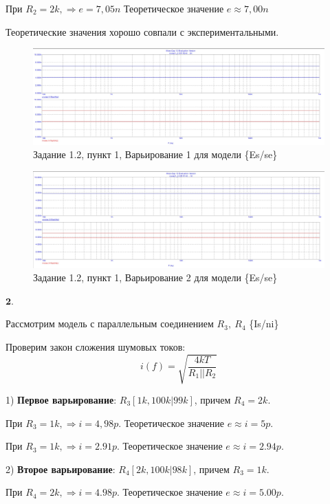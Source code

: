 \documentclass[a4paper, 14pt]{extarticle}%
\begin{document}
При $R_2 = 2k, \Rightarrow  e = 7,05n$
Теоретическое значение $e \approx 7,00n$

Теоретические значения хорошо совпали с экспериментальными.

\begin{figure}[h!]
			\centering
			\includegraphics[width=1.1\linewidth]{1.2/pic4.jpg}
			\caption{Задание 1.2, пункт 1, Варьирование 1 для модели \{Es/se\}}
			\label{A}
\end{figure}

\begin{figure}[h!]
			\centering
			\includegraphics[width=1.1\linewidth]{1.2/pic5.jpg}
			\caption{Задание 1.2, пункт 1, Варьирование 2 для модели \{Es/se\}}
			\label{A}
\end{figure}



$\textbf{2.}$


Рассмотрим модель с параллельным соединением $R_3, \: R_4$ \{Is/ni\}

Проверим закон сложения шумовых токов:
\[ i(f) = \sqrt{\frac{4kT}{R_1 || R_2}}  \]

1) \textbf{Первое варьирование}: $R_3[1k, 100k | 99k]$, причем $R_4 = 2k$.

При $R_3 = 1k, \Rightarrow  i = 4,98p$.
Теоретическое значение $e \approx i = 5p$.

При $R_3 = 1k, \Rightarrow  i = 2.91p$.
Теоретическое значение $e \approx i = 2.94p$.

2) \textbf{Второе варьирование}: $R_4[2k, 100k | 98k]$, причем $R_3 = 1k$.

При $R_4 = 2k, \Rightarrow  i = 4.98p$.
Теоретическое значение $e \approx i = 5.00p$.
\end{document}
